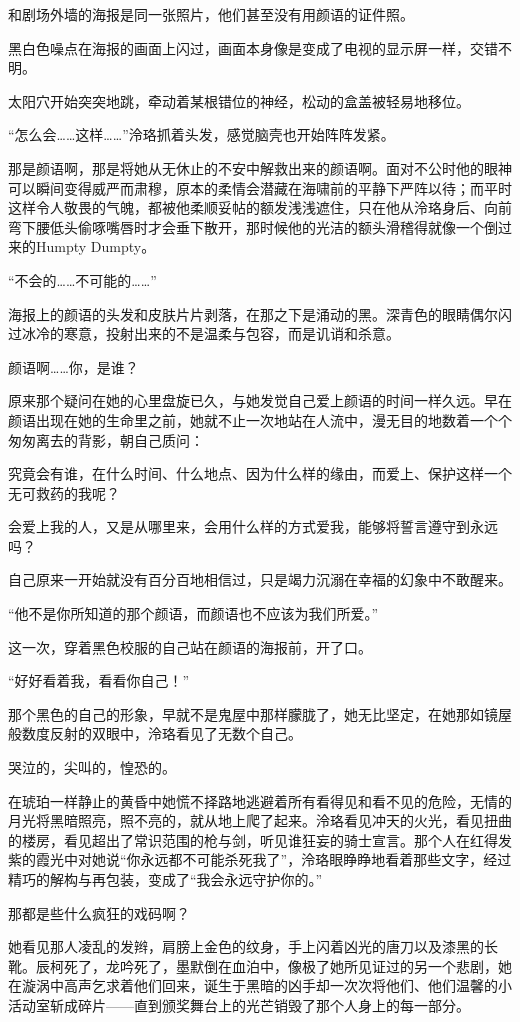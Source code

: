 \documentclass[UTF8, scheme = chinese, openany]{ctexbook}
\begin{document}
和剧场外墙的海报是同一张照片，他们甚至没有用颜语的证件照。

黑白色噪点在海报的画面上闪过，画面本身像是变成了电视的显示屏一样，交错不明。

太阳穴开始突突地跳，牵动着某根错位的神经，松动的盒盖被轻易地移位。

“怎么会……这样……”泠珞抓着头发，感觉脑壳也开始阵阵发紧。

那是颜语啊，那是将她从无休止的不安中解救出来的颜语啊。面对不公时他的眼神可以瞬间变得威严而肃穆，原本的柔情会潜藏在海啸前的平静下严阵以待；而平时这样令人敬畏的气魄，都被他柔顺妥帖的额发浅浅遮住，只在他从泠珞身后、向前弯下腰低头偷啄嘴唇时才会垂下散开，那时候他的光洁的额头滑稽得就像一个倒过来的Humpty Dumpty。

“不会的……不可能的……”

海报上的颜语的头发和皮肤片片剥落，在那之下是涌动的黑。深青色的眼睛偶尔闪过冰冷的寒意，投射出来的不是温柔与包容，而是讥诮和杀意。

颜语啊……你，是谁？

原来那个疑问在她的心里盘旋已久，与她发觉自己爱上颜语的时间一样久远。早在颜语出现在她的生命里之前，她就不止一次地站在人流中，漫无目的地数着一个个匆匆离去的背影，朝自己质问：

究竟会有谁，在什么时间、什么地点、因为什么样的缘由，而爱上、保护这样一个无可救药的我呢？

会爱上我的人，又是从哪里来，会用什么样的方式爱我，能够将誓言遵守到永远吗？

自己原来一开始就没有百分百地相信过，只是竭力沉溺在幸福的幻象中不敢醒来。

“他不是你所知道的那个颜语，而颜语也不应该为我们所爱。”

这一次，穿着黑色校服的自己站在颜语的海报前，开了口。

“好好看着我，看看你自己！”

那个黑色的自己的形象，早就不是鬼屋中那样朦胧了，她无比坚定，在她那如镜屋般数度反射的双眼中，泠珞看见了无数个自己。

哭泣的，尖叫的，惶恐的。

在琥珀一样静止的黄昏中她慌不择路地逃避着所有看得见和看不见的危险，无情的月光将黑暗照亮，照不亮的，就从地上爬了起来。泠珞看见冲天的火光，看见扭曲的楼房，看见超出了常识范围的枪与剑，听见谁狂妄的骑士宣言。那个人在红得发紫的霞光中对她说“你永远都不可能杀死我了”，泠珞眼睁睁地看着那些文字，经过精巧的解构与再包装，变成了“我会永远守护你的。”

那都是些什么疯狂的戏码啊？

她看见那人凌乱的发辫，肩膀上金色的纹身，手上闪着凶光的唐刀以及漆黑的长靴。辰柯死了，龙吟死了，墨默倒在血泊中，像极了她所见证过的另一个悲剧，她在漩涡中高声乞求着他们回来，诞生于黑暗的凶手却一次次将他们、他们温馨的小活动室斩成碎片——直到颁奖舞台上的光芒销毁了那个人身上的每一部分。
\end{document}
